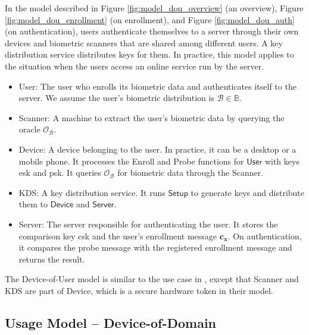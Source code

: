 In the model described in Figure \ref{fig:model_dou_overview} (an overview), Figure \ref{fig:model_dou_enrollment} (on enrollment), and Figure \ref{fig:model_dou_auth} (on authentication), users authenticate themselves to a server through their own devices and biometric scanners that are shared among different users.
A key distribution service distributes keys for them. In practice, this model applies to the situation when the users access an online service run by the server.

\begin{itemize}

	\item \textsf{User}: The user who enrolls its biometric data and authenticates itself to the server. We assume the user's biometric distribution is $\mathcal{B} \in \mathbb{B}$. 

	\item \textsf{Scanner}: A machine to extract the user's biometric data by querying the oracle $\mathcal{O}_{\mathcal{B}}$.
	
	\item \textsf{Device}: A device belonging to the user. In practice, it can be a desktop or a mobile phone. It processes the \textsf{Enroll} and \textsf{Probe} functions for $\textsf{User}$ with keys \textsf{esk} and \textsf{psk}. It queries $\mathcal{O}_{\mathcal{B}}$ for biometric data through the \textsf{Scanner}.
	
	\item \textsf{KDS}: A key distribution service. It runs $\textsf{Setup}$ to generate keys and distribute them to $\textsf{Device}$ and $\textsf{Server}$.
		
	\item \textsf{Server}: The server responsible for authenticating the user. It stores the comparison key \textsf{csk} and the user's enrollment message $\mathbf{c_x}$. On authentication, it compares the probe message with the registered enrollment message and returns the result.  

\end{itemize}

The Device-of-User model is similar to the use case in \cite{cryptoeprint:2023/481}, except that \textsf{Scanner} and \textsf{KDS} are part of \textsf{Device}, which is a secure hardware token in their model.





\subsection{Usage Model – Device-of-Domain}
\label{sec:dod_model}

